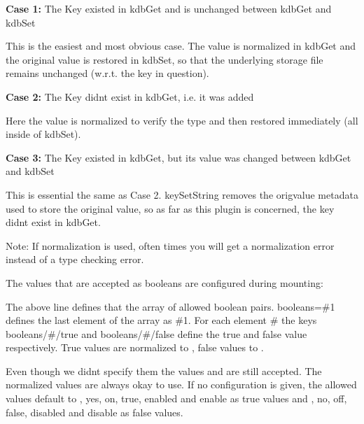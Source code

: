 \begin{DoxyItemize}
\item {\bfseries Case 1\+:} The Key existed in kdb\+Get and is unchanged between {\ttfamily kdb\+Get} and {\ttfamily kdb\+Set}

This is the easiest and most obvious case. The value is normalized in {\ttfamily kdb\+Get} and the original value is restored in {\ttfamily kdb\+Set}, so that the underlying storage file remains unchanged (w.\+r.\+t. the key in question).
\item {\bfseries Case 2\+:} The Key didn\textquotesingle{}t exist in {\ttfamily kdb\+Get}, i.\+e. it was added

Here the value is normalized to verify the type and then restored immediately (all inside of {\ttfamily kdb\+Set}).
\item {\bfseries Case 3\+:} The Key existed in {\ttfamily kdb\+Get}, but its value was changed between kdb\+Get and kdb\+Set

This is essential the same as Case 2. {\ttfamily key\+Set\+String} removes the {\ttfamily origvalue} metadata used to store the original value, so as far as this plugin is concerned, the key didn\textquotesingle{}t exist in {\ttfamily kdb\+Get}.
\end{DoxyItemize}

Note\+: If normalization is used, often times you will get a normalization error instead of a type checking error.

The values that are accepted as {\ttfamily boolean}s are configured during mounting\+:




The above line defines that the array of allowed boolean pairs. {\ttfamily booleans=\#1} defines the last element of the array as {\ttfamily \#1}. For each element {\ttfamily \#} the keys {\ttfamily booleans/\#/true} and {\ttfamily booleans/\#/false} define the true and false value respectively. True values are normalized to {}, false values to {}.

Even though we didn\textquotesingle{}t specify them the values {} and {} are still accepted. The normalized values are always okay to use. If no configuration is given, the allowed values default to {}, {\ttfamily yes}, {\ttfamily on}, {\ttfamily true}, {\ttfamily enabled} and {\ttfamily enable} as true values and {}, {\ttfamily no}, {\ttfamily off}, {\ttfamily false}, {\ttfamily disabled} and {\ttfamily disable} as false values.

